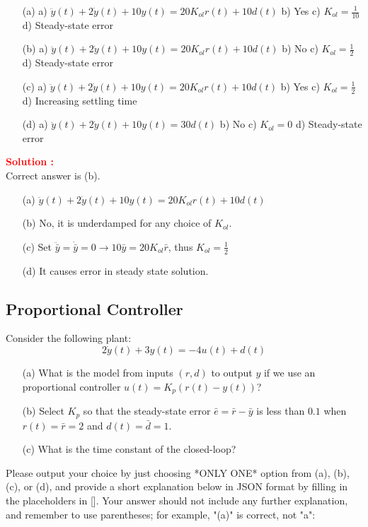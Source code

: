 \documentclass[12pt]{article}
\begin{document}
\begin{itemize}
    \item[(a)] a) \(\ddot{y}(t) + 2 \dot{y}(t) + 10 y(t) = 20 K_{ol}r(t) + 10 d(t)\) b) Yes c) \(K_{ol} = \frac{1}{10}\) d) Steady-state error
    \item[(b)] a) \(\ddot{y}(t) + 2 \dot{y}(t) + 10 y(t) = 20 K_{ol}r(t) + 10 d(t)\) b) No c) \(K_{ol} = \frac{1}{2}\) d) Steady-state error
    \item[(c)] a) \(\ddot{y}(t) + 2 \dot{y}(t) + 10 y(t) = 20 K_{ol}r(t) + 10 d(t)\) b) Yes c) \(K_{ol} = \frac{1}{2}\) d) Increasing settling time
    \item[(d)] a) \(\ddot{y}(t) + 2 \dot{y}(t) + 10 y(t) =  30 d(t)\) b) No c) \(K_{ol} = 0\) d) Steady-state error
\end{itemize}


\textbf{\textcolor{red}{Solution :}} \\
Correct answer is (b).\\
\begin{itemize}
    \item[(a)] $ \ddot{y}(t) + 2 \dot{y}(t) + 10 y(t) = 20 K_{ol}r(t) + 10 d(t)$
    \item[(b)] No, it is underdamped for any choice of \(K_{ol}\).
    \item[(c)] Set \(\ddot{\bar{y}} = \dot{\bar{y}} = 0 \rightarrow 10 \bar{y} = 20 K_{ol} \bar{r}\), thus \(K_{ol} = \frac{1}{2}\)
    \item[(d)] It causes error in steady state solution.
\end{itemize}
\clearpage

\subsection{Proportional Controller}

Consider the following plant:
\begin{equation}
    2\dot{y}(t) + 3 y(t) = -4 u(t) + d(t)
\end{equation}
\begin{itemize}
    \item[(a)] What is the model from inputs \((r,d)\) to output \(y\) if we use an proportional controller \(u(t) = K_p (r(t)-y(t))\)?
    \item[(b)] Select \(K_p\) so that the steady-state error \(\bar{e} = \bar{r} - \bar{y}\) is less than \(0.1\) when \(r(t) = \bar{r} = 2\) and \(d(t) = \bar{d} = 1\).
    \item[(c)] What is the time constant of the closed-loop?
\end{itemize}
Please output your choice by just choosing *ONLY ONE* option from (a), (b), (c), or (d), and provide a short explanation below in JSON format by filling in the placeholders in []. Your answer should not include any further explanation, and remember to use parentheses; for example, "(a)" is correct, not "a":
\end{document}
